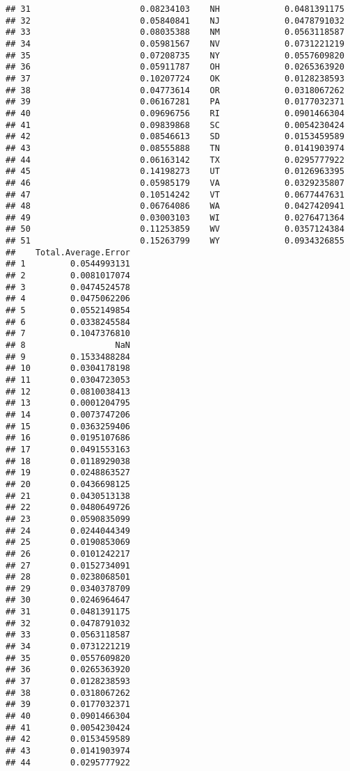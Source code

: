 \documentclass{article}\usepackage[]{graphicx}\usepackage[]{color}
\makeatletter
\newenvironment{kframe}{%
 \def\at@end@of@kframe{}%
 \ifinner\ifhmode%
  \def\at@end@of@kframe{\end{minipage}}%
  \begin{minipage}{\columnwidth}%
 \fi\fi%
 \def\FrameCommand##1{\hskip\@totalleftmargin \hskip-\fboxsep
 \colorbox{shadecolor}{##1}\hskip-\fboxsep
     \hskip-\linewidth \hskip-\@totalleftmargin \hskip\columnwidth}%
 \MakeFramed {\advance\hsize-\width
   \@totalleftmargin\z@ \linewidth\hsize
   \@setminipage}}%
 {\par\unskip\endMakeFramed%
 \at@end@of@kframe}
\newenvironment{knitrout}{}{} %
\makeatother
\begin{document}
\begin{knitrout}
\begin{kframe}
\begin{verbatim}
## 31                      0.08234103    NH             0.0481391175
## 32                      0.05840841    NJ             0.0478791032
## 33                      0.08035388    NM             0.0563118587
## 34                      0.05981567    NV             0.0731221219
## 35                      0.07208735    NY             0.0557609820
## 36                      0.05911787    OH             0.0265363920
## 37                      0.10207724    OK             0.0128238593
## 38                      0.04773614    OR             0.0318067262
## 39                      0.06167281    PA             0.0177032371
## 40                      0.09696756    RI             0.0901466304
## 41                      0.09839868    SC             0.0054230424
## 42                      0.08546613    SD             0.0153459589
## 43                      0.08555888    TN             0.0141903974
## 44                      0.06163142    TX             0.0295777922
## 45                      0.14198273    UT             0.0126963395
## 46                      0.05985179    VA             0.0329235807
## 47                      0.10514242    VT             0.0677447631
## 48                      0.06764086    WA             0.0427420941
## 49                      0.03003103    WI             0.0276471364
## 50                      0.11253859    WV             0.0357124384
## 51                      0.15263799    WY             0.0934326855
##    Total.Average.Error
## 1         0.0544993131
## 2         0.0081017074
## 3         0.0474524578
## 4         0.0475062206
## 5         0.0552149854
## 6         0.0338245584
## 7         0.1047376810
## 8                  NaN
## 9         0.1533488284
## 10        0.0304178198
## 11        0.0304723053
## 12        0.0810038413
## 13        0.0001204795
## 14        0.0073747206
## 15        0.0363259406
## 16        0.0195107686
## 17        0.0491553163
## 18        0.0118929038
## 19        0.0248863527
## 20        0.0436698125
## 21        0.0430513138
## 22        0.0480649726
## 23        0.0590835099
## 24        0.0244044349
## 25        0.0190853069
## 26        0.0101242217
## 27        0.0152734091
## 28        0.0238068501
## 29        0.0340378709
## 30        0.0246964647
## 31        0.0481391175
## 32        0.0478791032
## 33        0.0563118587
## 34        0.0731221219
## 35        0.0557609820
## 36        0.0265363920
## 37        0.0128238593
## 38        0.0318067262
## 39        0.0177032371
## 40        0.0901466304
## 41        0.0054230424
## 42        0.0153459589
## 43        0.0141903974
## 44        0.0295777922

\end{verbatim}
\end{kframe}
\end{knitrout}
\end{document}
